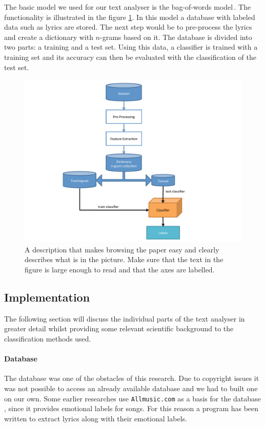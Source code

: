 \documentclass[a4paper,12pt]{article}
\begin{document}
The basic model we used for our text analyser is the bag-of-words model\,\cite{Mitchell}. The functionality is illustrated in the figure \ref{fig:bagOfWords}. In this model a database with labeled data such as lyrics are stored. The next step would be to pre-process the lyrics and create a dictionary with $n$-grams based on it. The database is divided into two parts: a training and a test set. Using this data, a classifier is trained with a training set and its accuracy can then be evaluated with the classification of the test set. 

\begin{figure}
\centering
\includegraphics[width=0.8\linewidth]{flowChartBagOfWords}
\caption{A description that makes browsing the paper easy and clearly 
describes what is in the picture. Make sure that the text in the figure 
is large enough to read and that the axes are labelled.}
\label{fig:bagOfWords}
\end{figure}

\subsection{Implementation}
\label{sec:impl}
The following section will discuss the individual parts of the text analyser in greater detail whilst providing some relevant scientific  background to the classification methods used. 

\paragraph{Database} The database was one of the obstacles of this research. Due to copyright issues it was not possible to access an already available database and we had to built one on our own. Some earlier researches use \texttt{Allmusic.com} as a basis for the database \cite{kim2010music}, since it provides emotional labels for songs. For this reason a program has been written to extract lyrics along with their emotional labels. 
\end{document}
